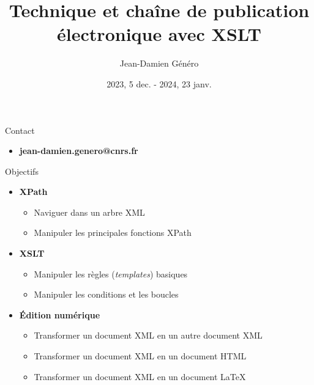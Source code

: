 \documentclass{beamer}
\title{Technique et chaîne de publication électronique avec XSLT}
\date{2023, 5 dec. - 2024, 23 janv.}
\author{Jean-Damien Généro}
\institute{École nationale des chartes -- M2 TNAH}
\begin{document}
      \maketitle
      
      \begin{frame}{Contact}
      \Large
          \begin{itemize}
              \item \textbf{jean-damien.genero@cnrs.fr}
          \end{itemize}
      \end{frame}


        \begin{frame}{Objectifs}
      \Large
          \begin{itemize}
              \item \textbf{XPath}
              \begin{itemize}
                  \item Naviguer dans un arbre XML
                  \item Manipuler les principales fonctions XPath
              \end{itemize}
              \item \textbf{XSLT}
              \begin{itemize}
                  \item Manipuler les règles (\textit{templates}) basiques
                  \item Manipuler les conditions et les boucles
              \end{itemize}
              \item \textbf{Édition numérique}
              \begin{itemize}
                  \item Transformer un document XML en un autre document XML
                  \item Transformer un document XML en un document HTML
                  \item Transformer un document XML en un document \LaTeX
              \end{itemize}
          \end{itemize}
      \end{frame}
       
\end{document}
